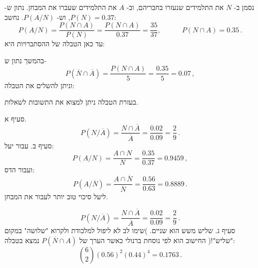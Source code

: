 \documentclass[12pt,a4paper]{article}
\newcommand{\bover}[1]{\bm{\overline{#1}}}
\begin{document}
נסמן ב-%
$N$
את התלמידים שנעזרו בחבריהם, וב-%
$A$
את התלמידים שעברו את המבחן. נתון ש-%
$P(N)=0.37$,
וש-%
$P(A/N)$.
נחשב:
\[
P(A/N) = \frac{P(N\cap A)}{P(N)} = \frac{P(N\cap A)}{0.37}=\frac{35}{37},\quad\quad\quad P(N\cap A)=0.35\,.
\]
עד כאן הטבלה של ההסתברויות היא:
\begin{center}
\end{center}
בהמשך נתון ש-%
\[
P(\overline{N}\cap\overline{A})=\frac{P(N\cap A)}{5}=\frac{0.35}{5}=0.07\,,
\]
וניתן להשלים את הטבלה:
\begin{center}
\end{center}
בעזרת הטבלה ניתן למצוא את התשובות לשאלות.

סעיף א.
\[
P(N/\overline{A})=\frac{N\cap \overline{A}}{\overline{A}}=\frac{0.02}{0.09}=\frac{2}{9}\,.
\]
סעיף ב. עבור יעל:
\[
P(A/N)=\frac{A \cap N}{N}=\frac{0.35}{0.37}=0.9459\,,
\]
ועבור הדס:
\[
P(A/\overline{N})=\frac{A\cap \overline{N}}{\overline{N}}=\frac{0.56}{0.63}=0.8889\,.
\]
ליעל סיכוי טוב יותר לעבור את המבחן.

\[
P(N/\overline{A})=\frac{N\cap \overline{A}}{\overline{A}}=\frac{0.02}{0.09}=\frac{2}{9}\,.
\]
סעיף ג. שליש משש הוא שניים. )שימו לב לא ליפול למלכודת ולקרוא "שלושה" במקום "שליש"!( החישוב הוא לפי נוסחת ברנולי כאשר הערך של
$P(\overline{N}\cap A)$
נמצא בטבלה:
\[
{6 \choose 2}(0.56)^2 (0.44)^4=0.1763\,.
\]
\end{document}
